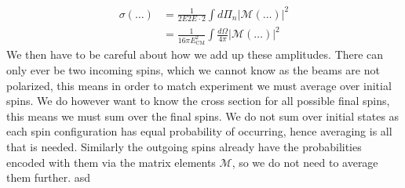 \documentclass[11pt]{article}
\numberwithin{equation}{section}
\begin{document}
\begin{itemize}
     \begin{align*}
         \sigma(\ldots)  &= \frac{1}{2E2E \cdot 2}\int d\Pi_n|\mathcal{M}(\ldots)|^2\\
          & =\frac{1}{16\pi E_{\text{CM}}^2}\int \frac{d \Omega}{4\pi}|\mathcal{M}(\ldots)|^2
     \end{align*}
     We then have to be careful about how we add up these amplitudes. There can only ever be two incoming spins, which we cannot know as the beams are not polarized, this means in order to match experiment we must average over initial spins. We do however want to know the cross section for all possible final spins, this means we must sum over the final spins. We do not sum over initial states as each spin configuration has equal probability of occurring, hence averaging is all that is needed. Similarly the outgoing spins already have the probabilities encoded with them via the matrix elements $\mathcal{M}$, so we do not need to average them further.   asd

\end{itemize}

\end{document}
